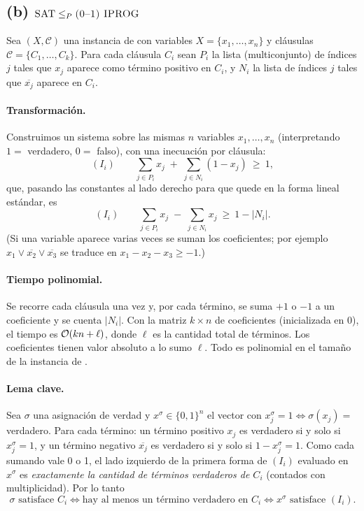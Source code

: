 \subsection*{(b) $\textsc{SAT}\le_P\textsc{(0--1) IPROG}$}

Sea $(X,\mathcal C)$ una instancia de \SAT{} con variables $X=\{x_1,\dots,x_n\}$ y cláusulas
$\mathcal C=\{C_1,\dots,C_k\}$. Para cada cláusula $C_i$ sean
$P_i$ la lista (multiconjunto) de índices $j$ tales que $x_j$ aparece como término positivo en $C_i$, y $N_i$ la
lista de índices $j$ tales que $\overline{x_j}$ aparece en $C_i$.

\paragraph{Transformación.} Construimos un sistema sobre las mismas $n$ variables $x_1,\dots,x_n$
(interpretando $1=$ verdadero, $0=$ falso), con una inecuación por cláusula:
\[
  (I_i)\qquad \sum_{j\in P_i} x_j \;+\; \sum_{j\in N_i} (1-x_j)\ \ge\ 1,
\]
que, pasando las constantes al lado derecho para que quede en la forma lineal estándar, es
\[
  (I_i)\qquad \sum_{j\in P_i} x_j \;-\; \sum_{j\in N_i} x_j\ \ge\ 1-|N_i|.
\]
(Si una variable aparece varias veces se suman los coeficientes; por ejemplo
$x_1\vee\overline{x_2}\vee\overline{x_3}$ se traduce en $x_1-x_2-x_3\ge -1$.)

\paragraph{Tiempo polinomial.} Se recorre cada cláusula una vez y, por cada término, se suma $+1$ o $-1$ a un
coeficiente y se cuenta $|N_i|$. Con la matriz $k\times n$ de coeficientes (inicializada en 0), el tiempo es
$\mathcal{O}(kn+\ell)$, donde $\ell$ es la cantidad total de términos. Los coeficientes tienen valor absoluto a lo sumo
$\ell$. Todo es polinomial en el tamaño de la instancia de \SAT.

\paragraph{Lema clave.} Sea $\sigma$ una asignación de verdad y $x^\sigma\in\{0,1\}^n$ el vector con
$x^\sigma_j=1\iff\sigma(x_j)=$ verdadero. Para cada término: un término positivo $x_j$ es verdadero si y solo si
$x^\sigma_j=1$, y un término negativo $\overline{x_j}$ es verdadero si y solo si $1-x^\sigma_j=1$. Como cada
sumando vale 0 o 1, el lado izquierdo de la primera forma de $(I_i)$ evaluado en $x^\sigma$ es
\emph{exactamente la cantidad de términos verdaderos de $C_i$} (contados con multiplicidad). Por lo tanto
\[
  \sigma \text{ satisface } C_i \iff \text{hay al menos un término verdadero en } C_i \iff x^\sigma \text{ satisface } (I_i).
\]

